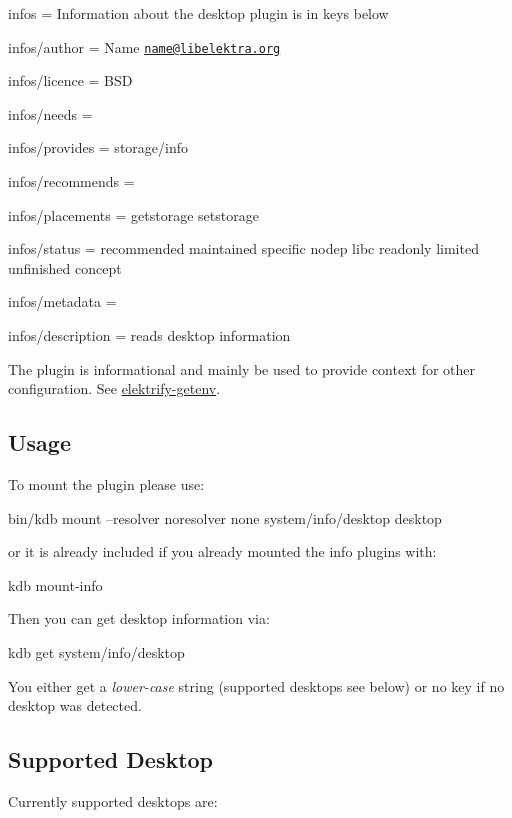 
\begin{DoxyItemize}
\item infos = Information about the desktop plugin is in keys below
\item infos/author = Name \href{mailto:name@libelektra.org}{\tt name@libelektra.\+org}
\item infos/licence = B\+S\+D
\item infos/needs =
\item infos/provides = storage/info
\item infos/recommends =
\item infos/placements = getstorage setstorage
\item infos/status = recommended maintained specific nodep libc readonly limited unfinished concept
\item infos/metadata =
\item infos/description = reads desktop information
\end{DoxyItemize}

The plugin is informational and mainly be used to provide context for other configuration. See \hyperlink{src_libs_getenv_README_md}{elektrify-\/getenv}.

\subsection*{Usage}

To mount the plugin please use\+: \begin{DoxyVerb}bin/kdb mount --resolver noresolver none system/info/desktop desktop
\end{DoxyVerb}


or it is already included if you already mounted the info plugins with\+: \begin{DoxyVerb}kdb mount-info
\end{DoxyVerb}


Then you can get desktop information via\+: \begin{DoxyVerb}kdb get system/info/desktop
\end{DoxyVerb}


You either get a {\itshape lower-\/case} string (supported desktops see below) or no key if no desktop was detected.

\subsection*{Supported Desktop}

Currently supported desktops are\+:


